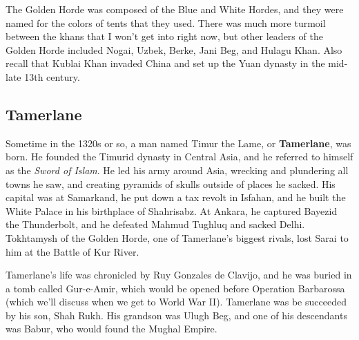 The Golden Horde was composed of the Blue and White Hordes,
and they were named for the colors of tents that they used.
There was much more turmoil between the khans that I won't get into right now,
but other leaders of the Golden Horde included Nogai, Uzbek, Berke, Jani Beg, and Hulagu Khan.
Also recall that Kublai Khan invaded China and set up the Yuan dynasty in the mid-late 13th century.

\subsection*{Tamerlane}

Sometime in the 1320s or so, a man named Timur the Lame, or \textbf{Tamerlane}, was born.
He founded the Timurid dynasty in Central Asia, and he referred to himself as the \textit{Sword of Islam}.
He led his army around Asia, wrecking and plundering all towns he saw,
and creating pyramids of skulls outside of places he sacked.
His capital was at Samarkand, he put down a tax revolt in Isfahan,
and he built the White Palace in his birthplace of Shahrisabz.
At Ankara, he captured Bayezid the Thunderbolt,
and he defeated Mahmud Tughluq and sacked Delhi.
Tokhtamysh of the Golden Horde, one of Tamerlane's biggest rivals, lost Sarai to him at the Battle of Kur River.

Tamerlane's life was chronicled by Ruy Gonzales de Clavijo, and he was buried in a tomb called Gur-e-Amir,
which would be opened before Operation Barbarossa (which we'll discuss when we get to World War II).
Tamerlane was be succeeded by his son, Shah Rukh.
His grandson was Ulugh Beg, and one of his descendants was Babur, who would found the Mughal Empire.
